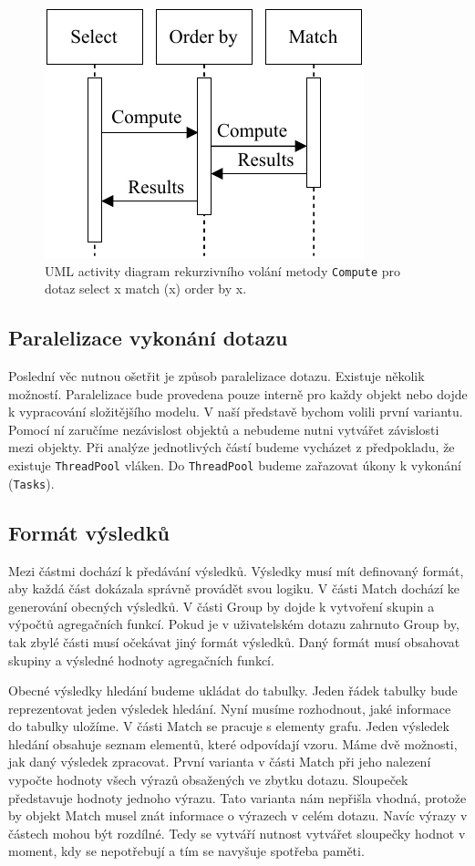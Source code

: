 \begin{figure}[!htp]
\includegraphics{../img/diaQueryObjectsCall.pdf}\centering
\caption{UML activity diagram rekurzivního volání metody \texttt{Compute} pro dotaz select x match (x) order by x.}
\label{figure.diaQueryObjectsCall}
\end{figure}

\subsection{Paralelizace vykonání dotazu}

Poslední věc nutnou ošetřit je způsob paralelizace dotazu.
Existuje několik možností.
Paralelizace bude provedena pouze interně pro každy objekt nebo dojde k vypracování složitějšího modelu.
V naší představě bychom volili první variantu.
Pomocí ní zaručíme nezávislost objektů a nebudeme nutni vytvářet závislosti mezi objekty.
Při analýze jednotlivých částí budeme vycházet z předpokladu, že existuje \texttt{ThreadPool} vláken.
Do \texttt{ThreadPool} budeme zařazovat úkony k vykonání (\texttt{Tasks}).

\subsection{Formát výsledků} \label{anal.tables}

Mezi částmi dochází k předávání výsledků.
Výsledky musí mít definovaný formát, aby každá část dokázala správně provádět svou logiku.
V části Match dochází ke generování obecných výsledků.
V části Group by dojde k vytvoření skupin a výpočtů agregačních funkcí.
Pokud je v uživatelském dotazu zahrnuto Group by, tak zbylé části musí očekávat jiný formát výsledků.
Daný formát musí obsahovat skupiny a výsledné hodnoty agregačních funkcí.

Obecné výsledky hledání budeme ukládat do tabulky.
Jeden řádek tabulky bude reprezentovat jeden výsledek hledání.
Nyní musíme rozhodnout, jaké informace do tabulky uložíme.
V části Match se pracuje s elementy grafu.
Jeden výsledek hledání obsahuje seznam elementů, které odpovídají vzoru.
Máme dvě možnosti, jak daný výsledek zpracovat.
První varianta v části Match při jeho nalezení vypočte hodnoty všech výrazů obsažených ve zbytku dotazu.
Sloupeček představuje hodnoty jednoho výrazu.
Tato varianta nám nepřišla vhodná, protože by objekt Match musel znát informace o výrazech v celém dotazu.
Navíc výrazy v částech mohou být rozdílné.
Tedy se vytváří nutnost vytvářet sloupečky hodnot v moment, kdy se nepotřebují a tím se navyšuje spotřeba paměti.

